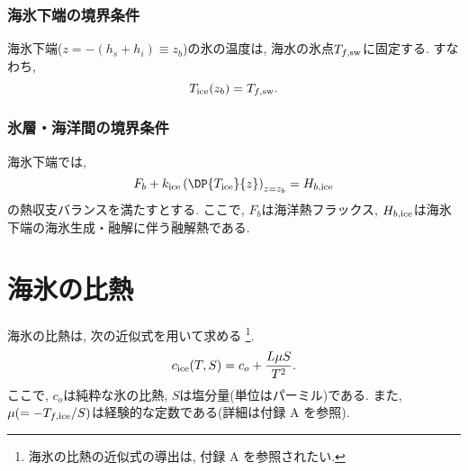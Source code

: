 \subsubsection*{海氷下端の境界条件}
海氷下端($z=-(h_s + h_i)\equiv z_b$)の氷の温度は, 海水の氷点$T_{f,{\rm sw}}$に固定する.
すなわち, 
\begin{equation}
  T_{\rm ice} (z_b)  = T_{f,{\rm sw}}.
\end{equation}

\subsubsection*{氷層・海洋間の境界条件}
海氷下端では, 
\begin{equation}
  F_b + k_{\rm ice} \left(\DP{T_{\rm ice}}{z} \right)_{z=z_b} = H_{b,{\rm ice}}
\end{equation}
の熱収支バランスを満たすとする.
ここで, $F_b$は海洋熱フラックス, $H_{b,{\rm ice}}$は海氷下端の海氷生成・融解に伴う融解熱である.

\section{海氷の比熱}
海氷の比熱は, 次の近似式\citep{untersteiner1961mass,ono1967specific}を用いて求める%
\footnote{
海氷の比熱の近似式の導出は, 付録 A を参照されたい.
}. 
\begin{equation}
  c_{\rm ice}(T,S) = c_o + \dfrac{L \mu S}{T^2}. 
\end{equation}
ここで, $c_o$は純粋な氷の比熱, $S$は塩分量(単位はパーミル)である. 
また, $\mu (= -T_{f,{\rm ice}}/S)$は経験的な定数である(詳細は付録 A を参照). 